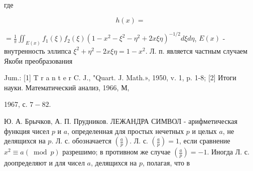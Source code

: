 \documentclass[10pt]{article}
\begin{document}
где



\[

h(x)=

\]



$=\frac{1}{\pi} \iint_{E(x)} f_{1}(\xi) f_{2}(\xi)\left(1-x^{2}-\xi^{2}-\eta^{2}+2 x \xi \eta\right)^{-1 / 2} d \xi d \eta$, $E(x)$ - внутренность эллипса $\xi^{2}+\eta^{2}-2 x \xi \eta=1-x^{2}$. Л. п. является частным случаем Якоби преобразования



Jum.: [1] T r a n t e r C. J., "Quart. J. Math.», 1950, v. 1, p. 1-8; [2] Итоги науки. Математический анализ, 1966, М,

1967, с. $7-82$.

Ю. А. Брычков, А. П. Прудников. ЛЕЖАНДРА СИМВОЛ - арифметическая функция чисел $p$ и $a$, определенная для простых нечетных $p$ и целых $a$, не делящихся на $p$. Л. с. обозначается $\left(\frac{a}{p}\right)$. Л. с. $\left(\frac{a}{p}\right)=1$, если сравнение $x^{2} \equiv a(\bmod p)$ разрешимо; в противном же случае $\left(\frac{a}{p}\right)=-1$. Иногда Л. с. доопределяют и для чисел $a$, делящихся на $p$, полагая, что в
\end{document}
